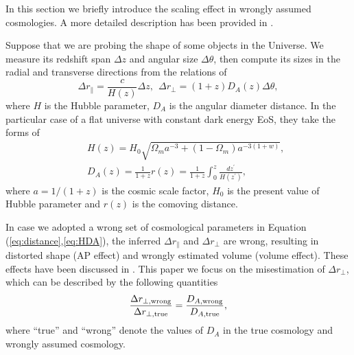 \documentclass[iop]{emulateapj}
\begin{document}
In this section we briefly introduce the scaling effect in wrongly assumed cosmologies.
A more detailed description has been provided in \cite{Li2014,Li2015,Li2016}.

Suppose that we are probing the shape of some objects in the Universe.
We measure its redshift span $\Delta z$ and angular size $\Delta \theta$,
then compute its sizes in the radial and transverse directions from the relations of 
\begin{equation}\label{eq:distance}
\Delta r_{\parallel} = \frac{c}{H(z)}\Delta z,\ \ \Delta r_{\bot}=(1+z)D_A(z)\Delta \theta,
\end{equation}
where $H$ is the Hubble parameter, $D_A$ is the angular diameter distance.
In the particular case of a flat universe with constant dark energy EoS, they take the forms of
\begin{eqnarray}\label{eq:HDA}
& &H(z) = H_0\sqrt{\Omega_ma^{-3}+(1-\Omega_m)a^{-3(1+w)}},\nonumber\\
& &D_A(z) = \frac{1}{1+z}r(z)=\frac{1}{1+z}\int_0^z \frac{dz^\prime}{H(z^\prime)},
\end{eqnarray}
where $a=1/(1+z)$ is the cosmic scale factor,
$H_0$ is the present value of Hubble parameter and $r(z)$ is the comoving distance.

In case we adopted a wrong set of cosmological parameters in Equation (\ref{eq:distance},\ref{eq:HDA}),
the inferred $\Delta r_{\parallel}$ and $\Delta r_{\bot}$ are wrong,
resulting in distorted shape (AP effect) and wrongly estimated volume (volume effect).
These effects have been discussed in \cite{Li2014,Li2015,Li2016}.
This paper we focus on the misestimation of $\Delta r_{\bot}$,%
which can be described by the following quantities
\begin{equation}\label{eq:DA}
 \frac{\Delta r_{\bot, \rm wrong}}{\Delta r_{\bot, \rm true}}
 = \frac{D_{A, \rm wrong}}{D_{A, \rm true}},
\end{equation}
where ``true'' and ``wrong'' denote the values of $D_A$ in the true cosmology and wrongly assumed cosmology.
\end{document}
